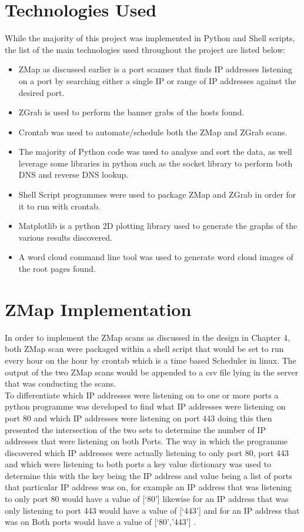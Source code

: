 \documentclass[a4wide,leqno,12pt]{report}
\begin{document}
\section{Technologies Used}
While the majority of this project was implemented in Python and Shell scripts, the list of the main technologies used throughout the project are listed below:
\begin{itemize}
  \item ZMap as discussed earlier is a port scanner that finds IP addresses listening on a port by searching either a single IP or range of IP addresses against the desired port.
  \item ZGrab is used to perform the banner grabs of the hosts found.
  \item Crontab \cite{keller1999take} was used to automate/schedule both the ZMap and ZGrab scans.
  \item The majority of Python code was used to analyse and sort the data, as well leverage some libraries in python such as the socket library \cite{socket} to perform both DNS and reverse DNS lookup.
  \item Shell Script programmes were used to package ZMap and ZGrab in order for it to run with crontab.
  \item Matplotlib \cite{matplotlib} is a python 2D plotting library used to generate the graphs of the various results discovered.
  \item A word cloud \cite{wordCloud} command line tool was used to generate word cloud images of the root pages found.
\end{itemize}

\section{ZMap Implementation}
In order to implement the ZMap scans as discussed in the design in Chapter 4, both ZMap scan were packaged within a shell script that would be set to run every hour on the hour by crontab which is a time based Scheduler in linux. The output of the two ZMap scans would be appended to a csv file lying in the server that was conducting the scans.\\

To differentiate which IP addresses were listening on to one or more ports a python programme was developed to find what IP addresses were listening on port 80 and which IP addresses were listening on port 443 doing this then presented the intersection of the two sets to determine the number of IP addresses that were listening on both Ports. The way in which the programme discovered which IP addresses were actually listening to only port 80, port 443 and which were listening to both ports a key value dictionary was used to determine this with the key being the IP address and value being a list of ports that particular IP address was on, for example an IP address that was listening to only port 80 would have a value of [‘80’] likewise for an IP address that was only listening to port 443 would have a value of [‘443’] and for an IP address that was on Both ports would have a value of [‘80’,’443’] .
\end{document}
